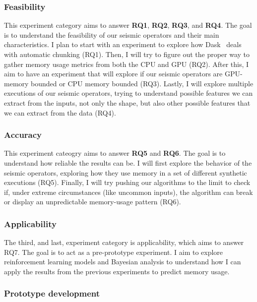 \subsubsection{Feasibility}
\label{subsubsec:feasibility-experiments}

This experiment category aims to answer \textbf{RQ1}, \textbf{RQ2}, \textbf{RQ3}, and \textbf{RQ4}.
The goal is to understand the feasibility of our seismic operators and their main characteristics.
I plan to start with an experiment to explore how Dask~\cite{dask} deals with automatic chunking (RQ1).
Then, I will try to figure out the proper way to gather memory usage metrics from both the \ac{CPU} and \ac{GPU} (RQ2).
After this, I aim to have an experiment that will explore if our seismic operators are \ac{GPU}-memory bounded or \ac{CPU} memory bounded (RQ3).
Lastly, I will explore multiple executions of our seismic operators, trying to understand possible features we can extract from the inputs, not only the shape, but also other possible features that we can extract from the data (RQ4).

\subsubsection{Accuracy}
\label{subsubsec:accuracy-experiments}

This experiment cateogry aims to answer \textbf{RQ5} and \textbf{RQ6}.
The goal is to understand how reliable the results can be.
I will first explore the behavior of the seismic operators, exploring how they use memory in a set of different synthetic executions (RQ5).
Finally, I will try pushing our algorithms to the limit to check if, under extreme circumstances (like uncommon inputs), the algorithm can break or display an unpredictable memory-usage pattern (RQ6).

\subsubsection{Applicability}
\label{subsubsec:applicability-experiments}

The third, and last, experiment category is applicability, which aims to answer RQ7.
The goal is to act as a pre-prototype experiment.
I aim to explore reinforcement learning models and Bayesian analysis to understand how I can apply the results from the previous experiments to predict memory usage.

\subsubsection{Prototype development}

